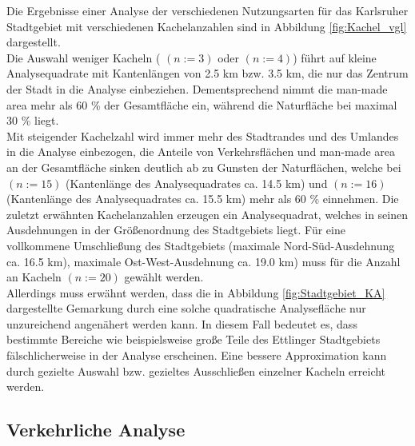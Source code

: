 \documentclass[12pt,a4paper]{scrartcl}
\begin{document}
%
Die Ergebnisse einer Analyse der verschiedenen Nutzungsarten für das Karlsruher Stadtgebiet mit verschiedenen Kachelanzahlen sind in Abbildung \ref{fig:Kachel_vgl} dargestellt.\\
Die Auswahl weniger Kacheln ( \((n:=3)\) oder  \((n:=4)\)) führt auf kleine Analysequadrate mit Kantenlängen von \num{2.5} \si{\kilo\metre} bzw. \num{3.5} \si{\kilo\metre}, die nur das Zentrum der Stadt in die Analyse einbeziehen. Dementsprechend nimmt die man-made area mehr als \num{60} \% der Gesamtfläche ein, während die Naturfläche bei maximal \num{30} \% liegt.\\
Mit steigender Kachelzahl wird immer mehr des Stadtrandes und des Umlandes in die Analyse einbezogen, die Anteile von Verkehrsflächen und man-made area an der Gesamtfläche sinken deutlich ab zu Gunsten der Naturflächen, welche bei  \((n:=15)\) (Kantenlänge des Analysequadrates ca. \num{14.5} \si{\kilo\metre}) und  \((n:=16)\) (Kantenlänge des Analysequadrates ca. \num{15.5} \si{\kilo\metre}) mehr als \num{60} \% einnehmen. Die zuletzt erwähnten Kachelanzahlen erzeugen ein Analysequadrat, welches in seinen Ausdehnungen in der Größenordnung des Stadtgebiets liegt. Für eine vollkommene Umschließung des Stadtgebiets (maximale Nord-Süd-Ausdehnung ca. \num{16.5} \si{\kilo\metre}), maximale Ost-West-Ausdehnung ca. \num{19.0} \si{\kilo\metre}) muss für die Anzahl an Kacheln \((n:=20)\) gewählt werden.\\
Allerdings muss erwähnt werden, dass die in Abbildung \ref{fig:Stadtgebiet_KA} dargestellte Gemarkung durch eine solche quadratische Analysefläche nur unzureichend angenähert werden kann. In diesem Fall bedeutet es, dass bestimmte Bereiche wie beispielsweise große Teile des Ettlinger Stadtgebiets fälschlicherweise in der Analyse erscheinen. Eine bessere Approximation kann durch gezielte Auswahl bzw. gezieltes Ausschließen einzelner Kacheln erreicht werden.







\newpage
\subsection{Verkehrliche Analyse}


\newpage
\end{document}

